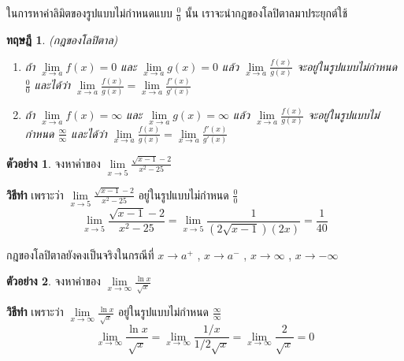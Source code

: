 \documentclass[
]{book}
\newtheorem{theorem}{ทฤษฎี}[chapter]
\theoremstyle{definition}
\theoremstyle{definition}
\newtheorem{example}{ตัวอย่าง}[chapter]
\theoremstyle{definition}
\theoremstyle{definition}
\theoremstyle{remark}
\begin{document}
ในการหาค่าลิมิตของรูปแบบไม่กำหนดแบบ \(\displaystyle \frac{0}{0}\) นั้น
เราจะนำกฎของโลปิตาลมาประยุกต์ใช้

\begin{theorem}

(กฎของโลปิตาล)\\

\begin{enumerate}
\def\labelenumi{\arabic{enumi}.}
\item
  ถ้า \(\mathop {\lim }\limits_{x\to a} f(x)=0\) และ \(\mathop {\lim
      }\limits_{x\to a} g(x)=0\) แล้ว
  \(\displaystyle \mathop {\lim }\limits_{x\to
      a}
      \frac{f(x)}{g(x)}\) จะอยู่ในรูปแบบไม่กำหนด
  \(\displaystyle \frac{0}{0}\) และได้ว่า
  \(\displaystyle \mathop {\lim }\limits_{x\to a}
      \frac{f(x)}{g(x)}=\mathop {\lim
      }\limits_{x\to a} \frac{{f}'(x)}{{g}'(x)}\)\\
\item
  ถ้า \(\mathop {\lim }\limits_{x\to a} f(x)=\infty\) และ \(\mathop {\lim
      }\limits_{x\to a} g(x)=\infty\) แล้ว \(\displaystyle \mathop {\lim
      }\limits_{x\to a}
      \frac{f(x)}{g(x)}\) จะอยู่ในรูปแบบไม่กำหนด
  \(\displaystyle \frac{\infty
      }{\infty }\) และได้ว่า
  \(\displaystyle \mathop {\lim }\limits_{x\to a}
      \frac{f(x)}{g(x)}=\mathop {\lim
      }\limits_{x\to a} \frac{{f}'(x)}{{g}'(x)}\)
\end{enumerate}

\end{theorem}

\begin{example}
จงหาค่าของ \(\displaystyle \mathop {\lim }\limits_{x\to 5} \frac{\sqrt
{x-1}
-2}{x^2-25}\)
\end{example}

\textbf{วิธีทำ} เพราะว่า
\(\displaystyle \mathop {\lim }\limits_{x\to 5} \frac{\sqrt
{x-1}
-2}{x^2-25}\) อยู่ในรูปแบบไม่กำหนด \(\displaystyle \frac{0}{0}\)
\[\displaystyle \mathop {\lim }\limits_{x\to 5} \frac{\sqrt {x-1} 
-2}{x^2-25}=\mathop {\lim 
}\limits_{x\to 5} \frac{1}{(2\sqrt {x-1} )(2x)}=\frac{1}{40}\]

กฎของโลปิตาลยังคงเป็นจริงในกรณีที่ \(x\to a^+\) , \(x\to a^-\) , \(x\to \infty\) ,
\(x\to -\infty\)

\begin{example}
จงหาค่าของ \(\displaystyle \mathop {\lim }\limits_{x\to \infty } \frac{\ln
x}{\sqrt x }\)
\end{example}

\textbf{วิธีทำ} เพราะว่า
\(\displaystyle \mathop {\lim }\limits_{x\to \infty } \frac{\ln
x}{\sqrt x
}\) อยู่ในรูปแบบไม่กำหนด \(\displaystyle \frac{\infty }{\infty }\)
\[\displaystyle \mathop {\lim }\limits_{x\to \infty } \frac{\ln x}{\sqrt x 
}=\mathop {\lim 
}\limits_{x\to \infty } \frac{1/x}{1/2\sqrt x }=\mathop {\lim }\limits_{x\to 
\infty } \frac{2}{\sqrt x }=0\]
\end{document}
